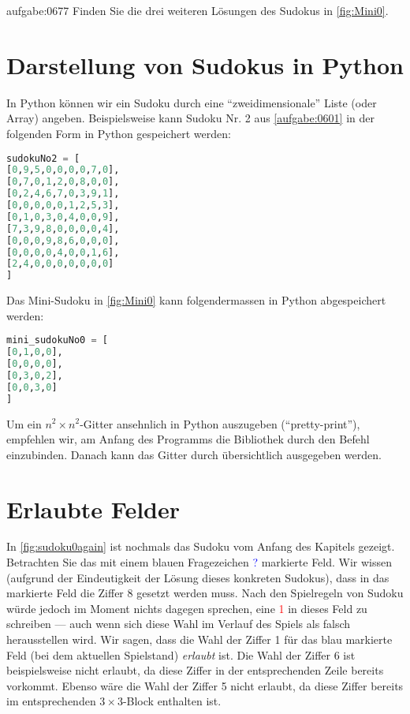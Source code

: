 \begin{aufgabe}{aufgabe:0677}
Finden Sie die drei weiteren Lösungen des Sudokus in \cref{fig:Mini0}.
\end{aufgabe}

\section{Darstellung von Sudokus in Python}
In Python können wir ein Sudoku durch eine \enquote{zweidimensionale} Liste (oder Array) angeben. Beispielsweise kann Sudoku Nr. 2 aus \cref{aufgabe:0601} in der folgenden Form in Python gespeichert werden:
\begin{lstlisting}[language=Python,caption=Abspeichern von Sudoku-Gittern in Python,numbers=none]
sudokuNo2 = [
[0,9,5,0,0,0,0,7,0],
[0,7,0,1,2,0,8,0,0],
[0,2,4,6,7,0,3,9,1],
[0,0,0,0,0,1,2,5,3],
[0,1,0,3,0,4,0,0,9],
[7,3,9,8,0,0,0,0,4],
[0,0,0,9,8,6,0,0,0],
[0,0,0,0,4,0,0,1,6],
[2,4,0,0,0,0,0,0,0]
]
\end{lstlisting}
\noindent
Das Mini-Sudoku in \cref{fig:Mini0} kann folgendermassen in Python abgespeichert werden:
\begin{lstlisting}[language=Python,caption=Abspeichern von Mini-Sudoku-Gittern in Python,numbers=none]
mini_sudokuNo0 = [
[0,1,0,0],
[0,0,0,0],
[0,3,0,2],
[0,0,3,0]
]
\end{lstlisting}
Um ein $n^2\times n^2$-Gitter ansehnlich in Python auszugeben (\enquote{pretty-print}), empfehlen wir, am Anfang des Programms die Bibliothek  durch den Befehl  einzubinden. Danach kann das Gitter durch  übersichtlich ausgegeben werden.


\section{Erlaubte Felder}
In \cref{fig:sudoku0again} ist nochmals das Sudoku vom Anfang des Kapitels gezeigt. Betrachten Sie das mit einem blauen Fragezeichen \textcolor{Blue}{?} markierte Feld. Wir wissen (aufgrund der Eindeutigkeit der Lösung dieses konkreten Sudokus), dass in das markierte Feld die Ziffer 8 gesetzt werden muss. Nach den Spielregeln von Sudoku würde jedoch im Moment nichts dagegen sprechen, eine \textcolor{Red}{1} in dieses Feld zu schreiben --- auch wenn sich diese Wahl im Verlauf des Spiels als falsch herausstellen wird. Wir sagen, dass die Wahl der Ziffer 1 für das blau markierte Feld (bei dem aktuellen Spielstand) \textit{erlaubt} ist. Die Wahl der Ziffer 6 ist beispielsweise nicht erlaubt, da diese Ziffer in der entsprechenden Zeile bereits vorkommt. Ebenso wäre die Wahl der Ziffer 5 nicht erlaubt, da diese Ziffer bereits im entsprechenden $3\times 3$-Block enthalten ist.

